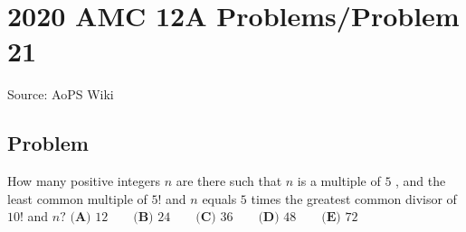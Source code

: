 \documentclass[12pt]{article}
\begin{document}
\section*{{2020 AMC 12A Problems/Problem 21}}
Source: AoPS Wiki

\subsection*{Problem}
How many positive integers $n$ are there such that $n$ is a multiple of $5$ , and the least common multiple of $5!$ and $n$ equals $5$ times the greatest common divisor of $10!$ and $n?$ $\textbf{(A) } 12 \qquad \textbf{(B) } 24 \qquad \textbf{(C) } 36 \qquad \textbf{(D) } 48 \qquad \textbf{(E) } 72$
\end{document}
